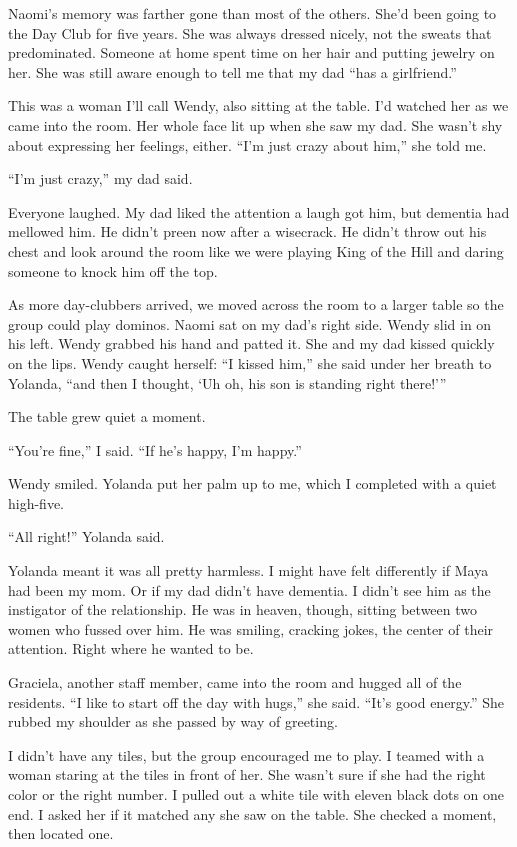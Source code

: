 \documentclass[12pt]{book}
\begin{document}
Naomi's memory was farther gone than most of the others. She'd been going to the Day Club for five years. She was always dressed nicely, not the sweats that predominated. Someone at home spent time on her hair and putting jewelry on her. She was still aware enough to tell me that my dad ``has a girlfriend.''

This was a woman I'll call Wendy, also sitting at the table. I'd watched her as we came into the room. Her whole face lit up when she saw my dad. She wasn't shy about expressing her feelings, either. ``I'm just crazy about him,'' she told me.

``I'm just crazy,'' my dad said.

Everyone laughed. My dad liked the attention a laugh got him, but dementia had mellowed him. He didn't preen now after a wisecrack. He didn't throw out his chest and look around the room like we were playing King of the Hill and daring someone to knock him off the top.

As more day-clubbers arrived, we moved across the room to a larger table so the group could play dominos. Naomi sat on my dad's right side. Wendy slid in on his left. Wendy grabbed his hand and patted it. She and my dad kissed quickly on the lips. Wendy caught herself: ``I kissed him,'' she said under her breath to Yolanda, ``and then I thought, `Uh oh, his son is standing right there!'''

The table grew quiet a moment.

``You're fine,'' I said. ``If he's happy, I'm happy.''

Wendy smiled. Yolanda put her palm up to me, which I completed with a quiet high-five.

``All right!'' Yolanda said.

Yolanda meant it was all pretty harmless. I might have felt differently if Maya had been my mom. Or if my dad didn't have dementia. I didn't see him as the instigator of the relationship. He was in heaven, though, sitting between two women who fussed over him. He was smiling, cracking jokes, the center of their attention. Right where he wanted to be.

Graciela, another staff member, came into the room and hugged all of the residents. ``I like to start off the day with hugs,'' she said. ``It's good energy.'' She rubbed my shoulder as she passed by way of greeting.

I didn't have any tiles, but the group encouraged me to play. I teamed with a woman staring at the tiles in front of her. She wasn't sure if she had the right color or the right number. I pulled out a white tile with eleven black dots on one end. I asked her if it matched any she saw on the table. She checked a moment, then located one.
\end{document}
